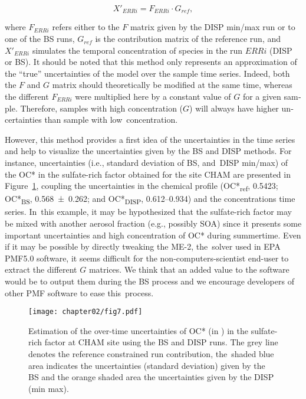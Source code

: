 \begin{otherlanguage}{english}
\begin{equation}
    X'_{ERRi} = F_{ERRi} \cdot G_{ref},
\end{equation}

where $F_{ERRi}$ refers either to the $F$ matrix given by the DISP min/max run or to one
of the BS runs, $G_{ref}$ is the contribution matrix of the reference run, and~$X'_{ERRi}$
simulates the temporal concentration of species in the run $ERRi$ (DISP or BS). It should
be noted that this method only represents an approximation of the ``true'' uncertainties
of the model over the sample time series. Indeed, both the $F$ and $G$ matrix should
theoretically be modified at the same time, whereas the different $F_{ERRi}$ were
multiplied here by a constant value of $G$ for a given sample.  Therefore, samples with
high concentration ($G$) will always have higher uncertainties than sample with
low~concentration.

However, this method provides a first idea of the uncertainties in the time series and
help to visualize the uncertainties given by the BS and DISP methods.  For instance,
uncertainties (i.e., standard deviation of BS, and~DISP min/max) of the OC* in the
sulfate-rich factor obtained for the site CHAM are presented in Figure~\ref{fig:fig7},
coupling the uncertainties in the chemical profile (OC*\textsubscript{ref},
\SI{0.5423}{\concum}; OC*\textsubscript{BS}, \SI{0.568\pm0.262}{\concum}; and
OC*\textsubscript{DISP}, \SIrange{0.612}{0.934}{\concum}) and the concentrations time
series. In~this example, it may be hypothesized that the sulfate-rich factor may be mixed
with another aerosol fraction (e.g., possibly SOA) since it presents some important
uncertainties and high concentration of OC* during summertime.  Even if it may be possible
by directly tweaking the ME-2, the~solver used in EPA PMF5.0 software, it seems difficult
for the non-computers-scientist end-user to extract the different $G$ matrices. We think
that an added value to the software would be to output them during the BS process and we
encourage developers of other PMF software to ease this~process.

\begin{figure}[ht]
    \centering
    \texttt{[image: chapter02/fig7.pdf]}
    \caption{
        Estimation of the over-time uncertainties of OC* (in \si{\concum}) in the
        sulfate-rich factor at CHAM site using the BS and DISP runs. The grey line denotes
        the reference constrained run contribution, the~shaded blue area indicates the
        uncertainties (standard deviation) given by the BS and the orange shaded area the
        uncertainties given by the DISP (min max).
    }
    \label{fig:fig7}
\end{figure}


\end{otherlanguage}
